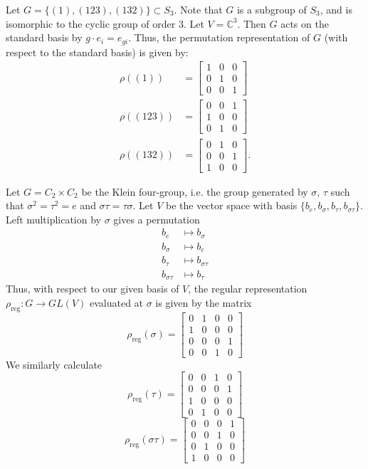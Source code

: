 \begin{example}
Let $G = \{ (1), (123), (132) \} \subset S_3$.  Note that $G$ is a subgroup of $S_3$, and is isomorphic to the cyclic group of order $3$. Let $V= \mathbb{C}^3$.  Then $G$ acts on the standard basis by $g \cdot e_i = e_ {gi}$.  Thus, the permutation representation of $G$ (with respect to the standard basis) is given by:
\begin{align*}
\rho((1)) &= \begin{bmatrix} 1 & 0 & 0 \\ 0 & 1 & 0 \\ 0 & 0 & 1 \end{bmatrix} \\
\rho((123)) &= \begin{bmatrix} 0 & 0 & 1 \\ 1 & 0 & 0 \\ 0 & 1 & 0 \end{bmatrix} \\
\rho((132)) &= \begin{bmatrix} 0 & 1  & 0 \\ 0 & 0 & 1 \\ 1 & 0 & 0 \end{bmatrix}.
\end{align*}
\end{example}

\begin{example}
Let $G= C_2 \times C_2$ be the Klein four-group, i.e. the group generated by $\sigma$, $\tau$ such that $\sigma^2 = \tau^2 = e$ and $\sigma \tau = \tau \sigma$.  Let $V$ be the vector space with basis $\{ b_e, b_\sigma, b_\tau, b_{\sigma \tau} \}$.  Left multiplication by $\sigma$ gives a permutation 
\begin{align*}
b_e &\mapsto b_\sigma\\
b_\sigma &\mapsto b_e \\
b_ \tau &\mapsto b_{\sigma \tau}\\
b_{\sigma \tau} &\mapsto b_\tau
\end{align*}
Thus, with respect to our given basis of $V$, the regular representation $\rho_{\text{reg}} \colon G \to GL(V)$ evaluated at $\sigma$ is given by the matrix
\[  \rho_{\text{reg}}(\sigma) = \begin{bmatrix}0 & 1 & 0 & 0 \\  1 & 0 & 0 & 0 \\ 0 & 0 & 0 & 1 \\ 0 & 0 & 1 & 0 \end{bmatrix} \]
We similarly calculate
\[  \rho_{\text{reg}}(\tau) = \begin{bmatrix}0&0&1&0 \\ 0&0&0&1 \\ 1&0&0&0 \\ 0&1&0&0 \end{bmatrix} \]
\[  \rho_{\text{reg}}(\sigma \tau) = \begin{bmatrix}0&0&0&1 \\ 0&0&1&0 \\ 0&1&0&0 \\ 1&0&0&0 \end{bmatrix} \]
\end{example}

